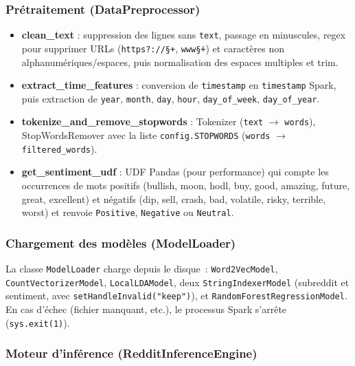 \documentclass[12pt,a4paper]{article}
\begin{document}
\subsubsection{Prétraitement (DataPreprocessor)}

\begin{itemize}[leftmargin=*]
  \item \textbf{clean\_text} : suppression des lignes sans \texttt{text}, passage en minuscules, regex pour supprimer URLs (\texttt{https?://\S+}, \texttt{www\.\S+}) et caractères non alphanumériques/espaces, puis normalisation des espaces multiples et trim.
  \item \textbf{extract\_time\_features} : conversion de \texttt{timestamp} en \texttt{timestamp} Spark, puis extraction de \texttt{year}, \texttt{month}, \texttt{day}, \texttt{hour}, \texttt{day\_of\_week}, \texttt{day\_of\_year}.
  \item \textbf{tokenize\_and\_remove\_stopwords} : Tokenizer (\texttt{text} $\rightarrow$ \texttt{words}), StopWordsRemover avec la liste \texttt{config.STOPWORDS} (\texttt{words} $\rightarrow$ \texttt{filtered\_words}).
  \item \textbf{get\_sentiment\_udf} : UDF Pandas (pour performance) qui compte les occurrences de mots positifs (bullish, moon, hodl, buy, good, amazing, future, great, excellent) et négatifs (dip, sell, crash, bad, volatile, risky, terrible, worst) et renvoie \texttt{Positive}, \texttt{Negative} ou \texttt{Neutral}.
\end{itemize}

\subsubsection{Chargement des modèles (ModelLoader)}

La classe \texttt{ModelLoader} charge depuis le disque~: \texttt{Word2VecModel}, \texttt{CountVectorizerModel}, \texttt{LocalLDAModel}, deux \texttt{StringIndexerModel} (subreddit et sentiment, avec \texttt{setHandleInvalid("keep")}), et \texttt{RandomForestRegressionModel}. En cas d'échec (fichier manquant, etc.), le processus Spark s'arrête (\texttt{sys.exit(1)}).

\subsubsection{Moteur d'inférence (RedditInferenceEngine)}
\end{document}
